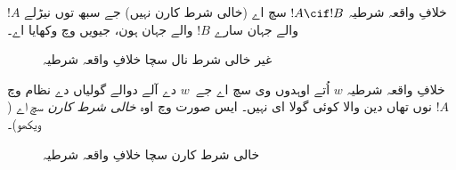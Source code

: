 \documentclass[../../../include/open-logic-section]{subfiles}
\begin{document}


خلافِ واقعہ شرطیہ $!A \cif !B$ سچ اے (خالی شرط کارن نہیں) جے سبھ توں
نیڑلے $!A$ والے جہان سارے $!B$ والے جہان ہون، جیویں  وچ
وکھایا اے۔
\begin{figure}
\begin{center}
\caption{غیر خالی شرط نال سچا خلافِ واقعہ شرطیہ}
\end{center}
\end{figure}
خلافِ واقعہ شرطیہ $w$ اُتے اوہدوں وی سچ اے جے~$w$ دے آلے دوالے گولیاں
دے نظام وچ $!A$ نوں تھاں دین والا کوئی گولا ای نہیں۔ ایس صورت وچ اوہ
\emph{خالی شرط کارن} سچ اے ( ویکھو)۔
\begin{figure}
\begin{center}
\caption{خالی شرط کارن سچا خلافِ واقعہ شرطیہ}
\end{center}
\end{figure}
\end{document}

